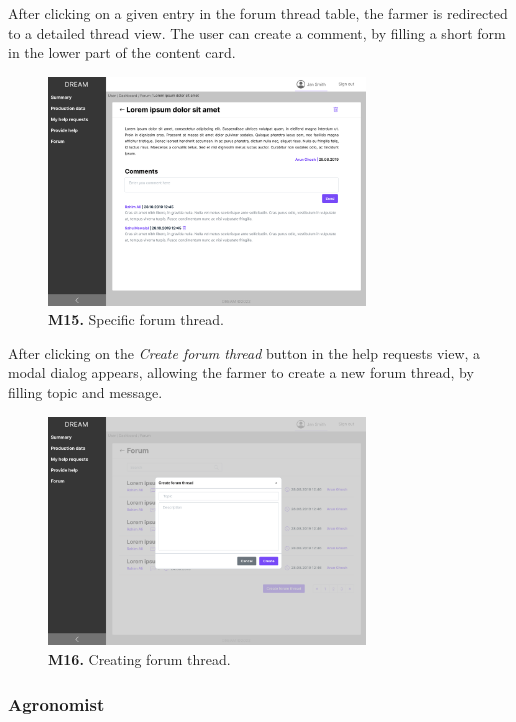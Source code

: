 After clicking on a given entry in the forum thread table, the farmer is redirected to a detailed thread view. The user can create a comment, by filling a short form in the lower part of the content card.
\begin{figure}[H]
    \centering
    \includegraphics[width=0.75\textwidth]{mockups/Farmer_Dashboard_Forum_Thread.png}
    \caption{\textbf{M15.} Specific forum thread.}
\end{figure}

After clicking on the \textit{Create forum thread} button in the help requests view, a modal dialog appears, allowing the farmer to create a new forum thread, by filling topic and message.
\begin{figure}[H]
    \centering
    \includegraphics[width=0.75\textwidth]{mockups/Farmer_Dashboard_Forum_Create thread.png}
    \caption{\textbf{M16.} Creating forum thread.}
\end{figure}


\subsubsection{Agronomist}

